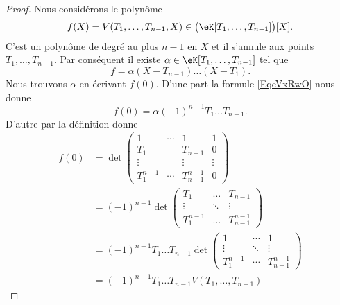 \begin{proof}
    Nous considérons le polynôme
    \begin{equation}
        f(X)=V(T_1,\ldots, T_{n-1},X)\in \big( \eK[T_1,\ldots, T_{n-1}] \big)[X].
    \end{equation}
    C'est un polynôme de degré au plus \( n-1\) en \( X\) et il s'annule aux points \( T_1,\ldots, T_{n-1}\). Par conséquent il existe \( \alpha\in \eK[T_1,\ldots, T_{n-1}]\) tel que
    \begin{equation}    \label{EqeVxRwO}
        f=\alpha(X-T_{n-1})\ldots(X-T_1).
    \end{equation}
    Nous trouvons \( \alpha\) en écrivant \( f(0)\). D'une part la formule \eqref{EqeVxRwO} nous donne
    \begin{equation}    \label{EqblwWMj}
        f(0)=\alpha(-1)^{n-1}T_1\ldots T_{n-1}.
    \end{equation}
    D'autre par la définition donne
    \begin{subequations}
        \begin{align}
            f(0)&=\det\begin{pmatrix}
                 1   &   \cdots    &   1    &   1    \\
                 T_1      &       &   T_{n-1}    &   0    \\
                 \vdots   &       &   \vdots    &   \vdots    \\ 
                 T_1^{n-1}   &   \cdots    &   T_{n-1}^{n-1}    &   0     
             \end{pmatrix}\\
             &=(-1)^{n-1}\det\begin{pmatrix}
                 T_1   &   \ldots    &   T_{n-1}    \\
                 \vdots   &   \ddots    &   \vdots    \\
                 T_1^{n-1}   &   \ldots    &   T_{n-1}^{n-1}
             \end{pmatrix}\\
             &=(-1)^{n-1}T_1\ldots T_{n-1}\det\begin{pmatrix}
                 1   &   \cdots    &   1    \\
                 \vdots   &   \ddots    &   \vdots    \\
                 T_1^{n-1}   &   \cdots    &   T_{n-1}^{n-1}
             \end{pmatrix}\\
             &=(-1)^{n-1}T_1\ldots T_{n-1}V(T_1,\ldots, T_{n-1})

\end{align}
\end{subequations}
\end{proof}
